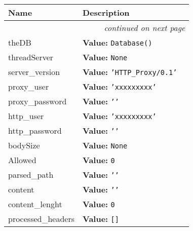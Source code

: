     \vspace{-1cm}
\hspace{\varindent}\begin{longtable}{|p{\varnamewidth}|p{\vardescrwidth}|l}
\cline{1-2}
\cline{1-2} \centering \textbf{Name} & \centering \textbf{Description}& \\
\cline{1-2}
\endhead\cline{1-2}\multicolumn{3}{r}{\small\textit{continued on next page}}\\\endfoot\cline{1-2}
\endlastfoot\raggedright t\-h\-e\-D\-B\- & \raggedright \textbf{Value:} 
{\tt Database()}&\\
\cline{1-2}
\raggedright t\-h\-r\-e\-a\-d\-S\-e\-r\-v\-e\-r\- & \raggedright \textbf{Value:} 
{\tt None}&\\
\cline{1-2}
\raggedright s\-e\-r\-v\-e\-r\-\_\-v\-e\-r\-s\-i\-o\-n\- & \raggedright \textbf{Value:} 
{\tt \texttt{'}\texttt{HTTP\_Proxy/0.1}\texttt{'}}&\\
\cline{1-2}
\raggedright p\-r\-o\-x\-y\-\_\-u\-s\-e\-r\- & \raggedright \textbf{Value:} 
{\tt \texttt{'}\texttt{xxxxxxxxx}\texttt{'}}&\\
\cline{1-2}
\raggedright p\-r\-o\-x\-y\-\_\-p\-a\-s\-s\-w\-o\-r\-d\- & \raggedright \textbf{Value:} 
{\tt \texttt{'}\texttt{}\texttt{'}}&\\
\cline{1-2}
\raggedright h\-t\-t\-p\-\_\-u\-s\-e\-r\- & \raggedright \textbf{Value:} 
{\tt \texttt{'}\texttt{xxxxxxxxx}\texttt{'}}&\\
\cline{1-2}
\raggedright h\-t\-t\-p\-\_\-p\-a\-s\-s\-w\-o\-r\-d\- & \raggedright \textbf{Value:} 
{\tt \texttt{'}\texttt{}\texttt{'}}&\\
\cline{1-2}
\raggedright b\-o\-d\-y\-S\-i\-z\-e\- & \raggedright \textbf{Value:} 
{\tt None}&\\
\cline{1-2}
\raggedright A\-l\-l\-o\-w\-e\-d\- & \raggedright \textbf{Value:} 
{\tt 0}&\\
\cline{1-2}
\raggedright p\-a\-r\-s\-e\-d\-\_\-p\-a\-t\-h\- & \raggedright \textbf{Value:} 
{\tt \texttt{'}\texttt{}\texttt{'}}&\\
\cline{1-2}
\raggedright c\-o\-n\-t\-e\-n\-t\- & \raggedright \textbf{Value:} 
{\tt \texttt{'}\texttt{}\texttt{'}}&\\
\cline{1-2}
\raggedright c\-o\-n\-t\-e\-n\-t\-\_\-l\-e\-n\-g\-h\-t\- & \raggedright \textbf{Value:} 
{\tt 0}&\\
\cline{1-2}
\raggedright p\-r\-o\-c\-e\-s\-s\-e\-d\-\_\-h\-e\-a\-d\-e\-r\-s\- & \raggedright \textbf{Value:} 
{\tt \texttt{[}\texttt{]}}&\\

\end{longtable}
